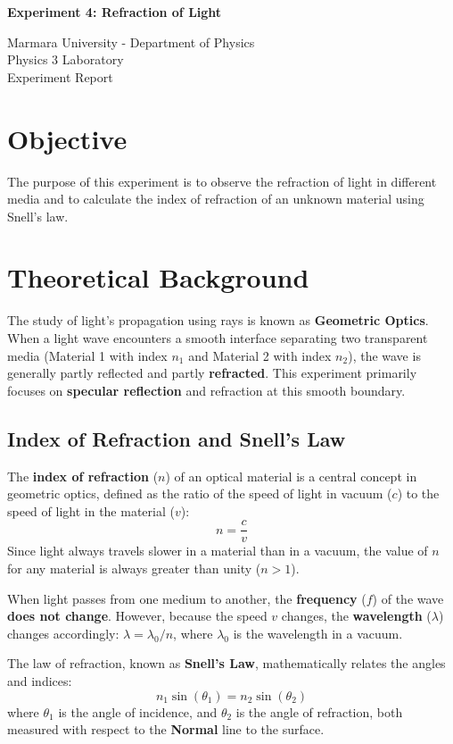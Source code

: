 \documentclass[12pt, a4paper]{article}
\begin{document}
\begin{center}
	\Large \textbf{Experiment 4: Refraction of Light}
	\vspace{0.5cm}
	
	\normalsize Marmara University - Department of Physics \\
	Physics 3 Laboratory \\
	Experiment Report
	\vspace{0.5cm}
\end{center}

\section{Objective}
The purpose of this experiment is to observe the refraction of light in different media and to calculate the index of refraction of an unknown material using Snell's law.

\section{Theoretical Background}
The study of light's propagation using rays is known as \textbf{Geometric Optics}. When a light wave encounters a smooth interface separating two transparent media (Material 1 with index $n_1$ and Material 2 with index $n_2$), the wave is generally partly reflected and partly \textbf{refracted}. This experiment primarily focuses on \textbf{specular reflection} and refraction at this smooth boundary.

\subsection{Index of Refraction and Snell's Law}
The \textbf{index of refraction} ($n$) of an optical material is a central concept in geometric optics, defined as the ratio of the speed of light in vacuum ($c$) to the speed of light in the material ($v$):
\[ n = \frac{c}{v} \]
Since light always travels slower in a material than in a vacuum, the value of $n$ for any material is always greater than unity ($n > 1$).

When light passes from one medium to another, the \textbf{frequency} ($f$) of the wave \textbf{does not change}. However, because the speed $v$ changes, the \textbf{wavelength} ($\lambda$) changes accordingly: $\lambda = \lambda_0 / n$, where $\lambda_0$ is the wavelength in a vacuum.

The law of refraction, known as \textbf{Snell's Law}, mathematically relates the angles and indices:
\[ n_1 \sin(\theta_1) = n_2 \sin(\theta_2) \]
where $\theta_1$ is the angle of incidence, and $\theta_2$ is the angle of refraction, both measured with respect to the \textbf{Normal} line to the surface.
\end{document}
